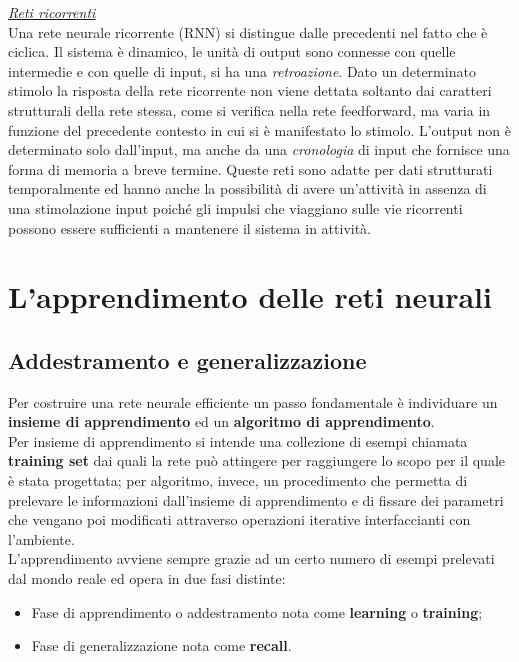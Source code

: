 \documentclass[12pt,a4paper,oneside]{book}
\begin{document}
		\underline{\emph{Reti ricorrenti}}\\
		Una rete neurale ricorrente (RNN) si distingue dalle precedenti nel fatto che è ciclica. Il sistema è dinamico, le unità di output sono connesse con quelle intermedie e con quelle di input, si ha una \emph{retroazione}. Dato un determinato stimolo la risposta della rete ricorrente non viene dettata soltanto dai caratteri strutturali della rete stessa, come si verifica nella rete feedforward, ma varia in funzione del precedente contesto in cui si è manifestato lo stimolo. L'output non è determinato solo dall'input, ma anche da una \emph{cronologia} di input che fornisce una forma di memoria a breve termine. Queste reti sono adatte per dati strutturati temporalmente ed hanno anche la possibilità di avere un’attività in assenza di una stimolazione input poiché gli impulsi che viaggiano sulle vie ricorrenti possono essere sufficienti a mantenere il sistema in attività.
	



	
\chapter{L'apprendimento delle reti neurali}
	
	
	\section{Addestramento e generalizzazione}
		
		Per costruire una rete neurale efficiente un passo fondamentale è individuare un \textbf{insieme di apprendimento} ed un \textbf{algoritmo di apprendimento}.\\
		Per insieme di apprendimento si intende una collezione di esempi chiamata \textbf{training set} dai quali la rete può attingere per raggiungere lo scopo per il quale è stata progettata; per algoritmo, invece, un procedimento che permetta di prelevare le informazioni dall'insieme di apprendimento e di fissare dei parametri che vengano poi modificati attraverso operazioni iterative interfaccianti con l'ambiente.\\
		L’apprendimento avviene sempre grazie ad un certo numero di esempi prelevati dal mondo reale ed opera in due fasi distinte: 
		
		\begin{itemize}
			\item Fase di apprendimento o addestramento nota come \textbf{learning} o \textbf{training};\\
			\item Fase di generalizzazione nota come \textbf{recall}.
		\end{itemize} 
		
\end{document}
